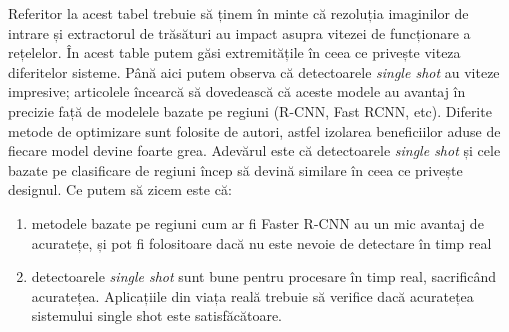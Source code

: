 Referitor la acest tabel trebuie să ținem în minte că rezoluția imaginilor de intrare și extractorul de trăsături au impact asupra vitezei de funcționare a rețelelor. În acest table putem găsi extremitățile în ceea ce privește viteza diferitelor sisteme.\newline
Până aici putem observa că detectoarele \textit{single shot} au viteze impresive; articolele încearcă să dovedească că aceste modele au avantaj în precizie față de modelele bazate pe regiuni (R-CNN, Fast RCNN, etc). Diferite metode de optimizare sunt folosite de autori, astfel izolarea beneficiilor aduse de fiecare model devine foarte grea. Adevărul este că detectoarele \textit{single shot} și cele bazate pe clasificare de regiuni încep să devină similare în ceea ce privește designul. Ce putem să zicem este că:
\begin{enumerate}
	\item metodele bazate pe regiuni cum ar fi Faster R-CNN au un mic avantaj de acuratețe, și pot fi folositoare dacă nu este nevoie de detectare în timp real
	\item detectoarele \textit{single shot} sunt bune pentru procesare în timp real, sacrificând acuratețea. Aplicațiile din viața reală trebuie să verifice dacă acuratețea sistemului single shot este satisfăcătoare.
\end{enumerate}


